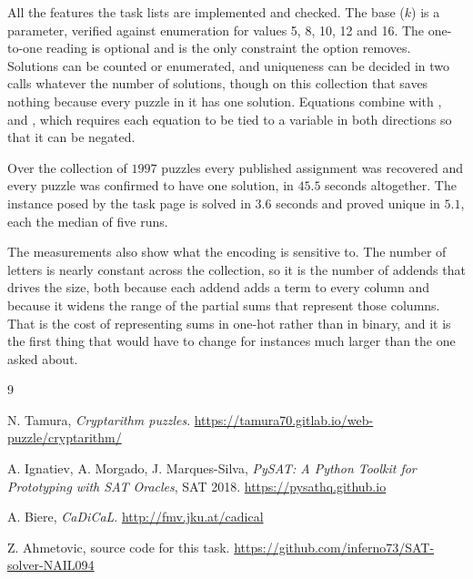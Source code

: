 \documentclass[11pt,a4paper]{article}
\begin{document}
All the features the task lists are implemented and checked. The base ($k$) is a
parameter, verified against enumeration for values 5, 8, 10, 12 and 16. The
one-to-one reading is optional and is the only constraint the option removes.
Solutions can be counted or enumerated, and uniqueness can be decided in two
calls whatever the number of solutions, though on this collection that saves
nothing because every puzzle in it has one solution. Equations combine with ,  and
, which requires each equation to be tied to a variable in both
directions so that it can be negated.

Over the collection of $1997$ puzzles every published assignment was recovered
and every puzzle was confirmed to have one solution, in $45.5$ seconds
altogether. The instance posed by the task page is solved in $3.6$ seconds and
proved unique in $5.1$, each the median of five runs.

The measurements also show what the encoding is sensitive to. The number of
letters is nearly constant across the collection, so it is the number of
addends that drives the size, both because each addend adds a term to every
column and because it widens the range of the partial sums that represent
those columns. That is the cost of representing sums in one-hot rather than in
binary, and it is the first thing that would have to change for instances much
larger than the one asked about.

\clearpage

\begin{thebibliography}{9}

N. Tamura, \emph{Cryptarithm puzzles}.
\url{https://tamura70.gitlab.io/web-puzzle/cryptarithm/}

A. Ignatiev, A. Morgado, J. Marques-Silva,
\emph{PySAT: A Python Toolkit for Prototyping with SAT Oracles}, SAT 2018.
\url{https://pysathq.github.io}

A. Biere, \emph{CaDiCaL}.
\url{http://fmv.jku.at/cadical}

Z. Ahmetovic, source code for this task.
\url{https://github.com/inferno73/SAT-solver-NAIL094}

\end{thebibliography}
\end{document}
